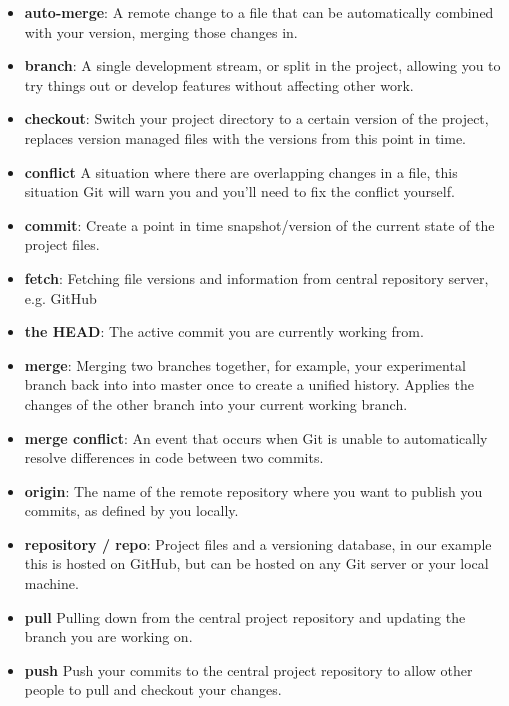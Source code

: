 \begin{itemize}[leftmargin=*]
	\item
	\textbf{auto-merge}:
		A remote change to a file that can be automatically combined with your version, merging those changes in.
	\item
		\textbf{branch}:
		A single development stream, or split in the project, allowing you to try things out or develop features without affecting other work.
	\item
		\textbf{checkout}:
		Switch your project directory to a certain version of the project, replaces version managed files with the versions from this point in time.
	\item
		\textbf{conflict}
		A situation where there are overlapping changes in a file, this situation Git will warn you and you’ll need to fix the conflict yourself.
	\item
		\textbf{commit}:
		Create a point in time snapshot/version of the current state of the project files.
	\item
        \textbf{fetch}:
		Fetching file versions and information from central repository server, e.g. GitHub
	\item
        \textbf{the HEAD}:
		The active commit you are currently working from.
	\item
		\textbf{merge}:
		Merging two branches together, for example, your experimental branch back into into master once to create a unified history. Applies the changes of the other branch into your current working branch.
    \item
		\textbf{merge conflict}:
		An event that occurs when Git is unable to automatically resolve differences in code between two commits.
	\item
		\textbf{origin}:
		The name of the remote repository where you want to publish you commits, as defined by you locally.
	\item
        \textbf{repository / repo}:
        Project files and a versioning database, in our example this is hosted on GitHub, but can be hosted on any Git server or your local machine.
    \item
    	\textbf{pull}
    	Pulling down from the central project repository and updating the branch you are working on.
    \item
    	\textbf{push}
    	Push your commits to the central project repository to allow other people to pull and checkout your changes.
\end{itemize}